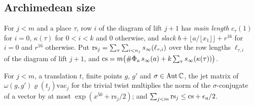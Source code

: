 \subsection{Archimedean size}\label{ss:archimedean-size}
For $j<m$ and a place $\tau$, row $i$ of the diagram of lift $j+1$ has \emph{main length} $c_\tau(1)$ for $i=0$, $\kappa(\tau)$ for $0<i<k$ and $0$
otherwise, and \emph{slack} $b+\lfloor a/\lfloor x_1\rfloor\rfloor+r^{16}$ for $i=0$ and $r^{16}$ otherwise. Put
$\mathrm{rs}_j=\sum_\tau\sum_{i<n_j}s_\infty(\ell_{\tau,i})$ over the row lengths $\ell_{\tau,i}$ of the diagram of lift $j+1$, and
$\mathrm{cs}=m\bigl(\#\Phi_a\,s_\infty(a)+k\sum_\tau s_\infty(\kappa(\tau))\bigr)$.

\begin{lemma}\label{lem:one-kernel-size}
For $j<m$, a translation $t$, finite points $g$, $g'$ and $\sigma\in\operatorname{Aut}\mathbb{C}$, the jet matrix of $\omega(g,g')\varrho(t_j)\mathrm{vac}_j$ for the
trivial twist multiplies the norm of the $\sigma$-conjugate of a vector by at most $\exp(x^{50}+\mathrm{rs}_j/2)$; and
$\sum_{j<m}\mathrm{rs}_j\le\mathrm{cs}+\epsilon_{\mathrm{u}}/2$.
\end{lemma}


